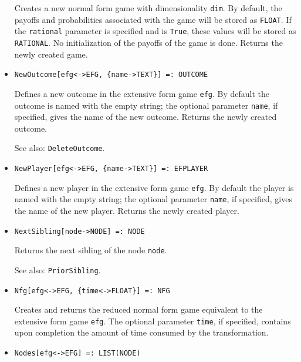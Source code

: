 \begin{itemize}
\bd
Creates a new normal form game with dimensionality \verb+dim+.
By default, the payoffs and probabilities associated with the game will
be stored as {\tt FLOAT}.  If the \verb+rational+ parameter is specified
and is \verb+True+, these values will be stored as {\tt RATIONAL}.
No initialization of the payoffs of the game is done.
Returns the newly created game.
\ed

\item
\protect \large \begin{verbatim} 
NewOutcome[efg<->EFG, {name->TEXT}] =: OUTCOME
\end{verbatim}\normalsize

\bd
Defines a new outcome in the extensive form game \verb+efg+.
By default the outcome is named with the empty string; the optional parameter
\verb+name+, if specified, gives the name of the new outcome.  Returns the
newly created outcome.
\item
[See also:] {\tt DeleteOutcome}.
\ed

\item
\protect \large \begin{verbatim}
NewPlayer[efg<->EFG, {name->TEXT}] =: EFPLAYER 
\end{verbatim}\normalsize

\bd
Defines a new player in the extensive form game \verb+efg+.
By default the player is named with the empty string; the optional parameter
\verb+name+, if specified, gives the name of the new player.  Returns the
newly created player.
\ed

\item
\protect \large \begin{verbatim}
NextSibling[node->NODE] =: NODE
\end{verbatim}\normalsize

\bd
Returns the next sibling of the node \verb+node+.
\item
[See also:] {\tt PriorSibling}.
\ed

\item
\protect \large \begin{verbatim}
Nfg[efg<->EFG, {time<->FLOAT}] =: NFG
\end{verbatim}\normalsize

\bd
Creates and returns the reduced normal form game equivalent
to the extensive form game \verb+efg+.  The optional parameter \verb+time+,
if specified, contains upon completion the amount of time consumed by
the transformation.
\ed

\item
\protect \large \begin{verbatim} 
Nodes[efg<->EFG] =: LIST(NODE)
\end{verbatim}\normalsize


\end{itemize}

